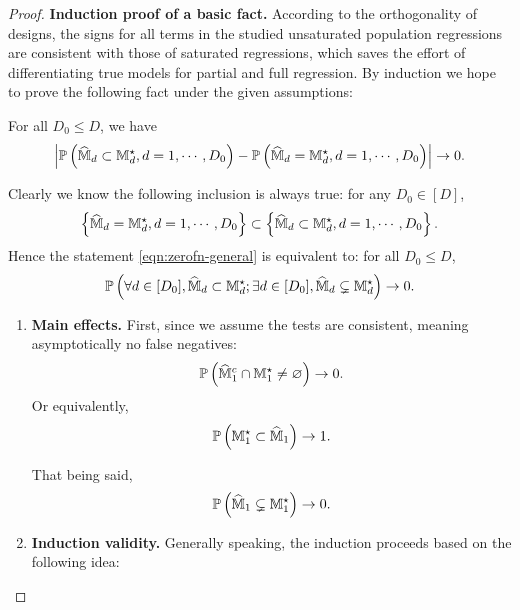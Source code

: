 \documentclass[12pt]{article}
\begin{document}
\begin{proof}
\textbf{Induction proof of a basic fact.} According to the orthogonality of designs, the signs for all terms in the studied unsaturated population regressions are consistent with those of saturated regressions, which saves the effort of differentiating true models for partial and full regression. By induction we hope to prove the following fact under the given assumptions:


\begin{displayquote}
For all $D_0\le D$, we have 
\begin{align}%
\lt|\bbP\lt(\hat{\bbM}_d\subset\bbM^\star_d, d=1,\cdots,D_0\rt)-\bbP\lt(\hat{\bbM}_d=\bbM^\star_d, d=1,\cdots,D_0\rt)\rt|\to 0.
\end{align} 
\end{displayquote}

Clearly we know the following inclusion is always true: for any $D_0\in[D]$,
$$\left\{\widehat{{\mathbb{M}}}_d={\mathbb{M}}^\star_d, d=1,\cdots,D_0\right\}\subset\left\{\widehat{{\mathbb{M}}}_d\subset{\mathbb{M}}^\star_d, d=1,\cdots,D_0\right\}.$$ 
Hence the statement \eqref{eqn:zerofn-general} is equivalent to: for all $D_0\le D$,
\begin{align}%
\bbP\lt(\forall d\in[D_0],\hat{\bbM}_d\subset\bbM^\star_d; \exists d\in[D_0], \hat{\bbM}_d\subsetneq\bbM^\star_d\rt)\to 0.
\end{align} 


\begin{enumerate}
    \item \textbf{Main effects.}
    First, since we assume the tests are consistent, meaning asymptotically no false negatives:
    \begin{align*}
        {\mathbb{P}}\left({\widehat{{\mathbb{M}}}_1}^c \cap{\mathbb{M}}^\star_1\neq \varnothing\right)\to 0.
    \end{align*}
    Or equivalently, 
    \begin{align*} 
        {\mathbb{P}}\left({\mathbb{M}}^\star_1\subset{\widehat{{\mathbb{M}}}_1}\right)\to 1.
    \end{align*}
    
    That being said, 
    \begin{align}%
      \bbP\lt(\hat{\bbM}_1\subsetneq\bbM^\star_1\rt)\to 0.
    \end{align} 
    
    
    
    \item \textbf{Induction validity.}
    Generally speaking, the induction proceeds based on the following idea:
    


\end{enumerate}
\end{proof}
\end{document}
